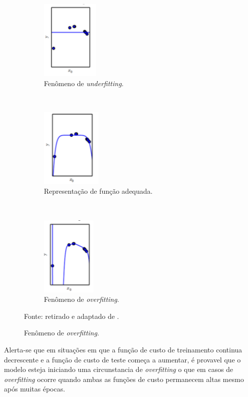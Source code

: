 \begin{figure}[H]
   \caption{Fenômenos de \textit{underfitting} e \textit{overfitting}.}
   \centering
   \label{deep:fig:5}
    \begin{subfigure}[t]{0.45\textwidth}
        \centering
        \includegraphics[height=1.5in]{recursos/imagens/deep/under.png}
        \caption{Fenômeno de \textit{underfitting}.}
        \label{deep:fig:5.1}
    \end{subfigure}
    ~ 
    \begin{subfigure}[t]{0.45\textwidth}
        \centering
        \includegraphics[height=1.5in]{recursos/imagens/deep/apx.png}
        \caption{Representação de função adequada.}
        \label{deep:fig:5.2}
    \end{subfigure}
    ~
    \begin{subfigure}[t]{0.45\textwidth}
        \centering
        \includegraphics[height=1.5in]{recursos/imagens/deep/over.png}
        \caption{Fenômeno de \textit{overfitting}.}
        \label{deep:fig:5.3}
    \end{subfigure}

    \vspace*{1 cm}
    Fonte: retirado e adaptado de \cite{Goodfellow2016}.
\end{figure}

Alerta-se que em situações em que a função de custo de treinamento continua decrescente e a função de custo de teste começa a aumentar, é provavel que o modelo esteja iniciando uma circunstancia de \textit{overfitting} o que em casos de \textit{overfitting} ocorre quando ambas as funções de custo permanecem altas mesmo após muitas épocas.

